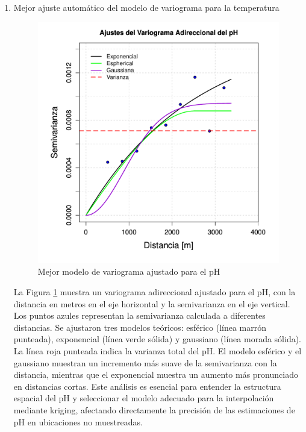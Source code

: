 \begin{enumerate}
\item Mejor ajuste automático del modelo de variograma para la temperatura
\begin{figure}[!htb]
    \centering
    \includegraphics[width=0.8\linewidth]{Figuras_AED/VARIOGRAFICO/ph_VarioAllModelEstimation.pdf}
    \caption{Mejor modelo de variograma ajustado  para el pH}
    \label{fig:enter-labelcer}
\end{figure}

 La Figura \ref{fig:enter-labelcer} muestra un variograma adireccional ajustado para el pH, con la distancia en metros en el eje horizontal y la semivarianza en el eje vertical. Los puntos azules representan la semivarianza calculada a diferentes distancias. Se ajustaron tres modelos teóricos: esférico (línea marrón punteada), exponencial (línea verde sólida) y gaussiano (línea morada sólida). La línea roja punteada indica la varianza total del pH. El modelo esférico y el gaussiano muestran un incremento más suave de la semivarianza con la distancia, mientras que el exponencial muestra un aumento más pronunciado en distancias cortas. Este análisis es esencial para entender la estructura espacial del pH y seleccionar el modelo adecuado para la interpolación mediante kriging, afectando directamente la precisión de las estimaciones de pH en ubicaciones no muestreadas.



\end{enumerate}
